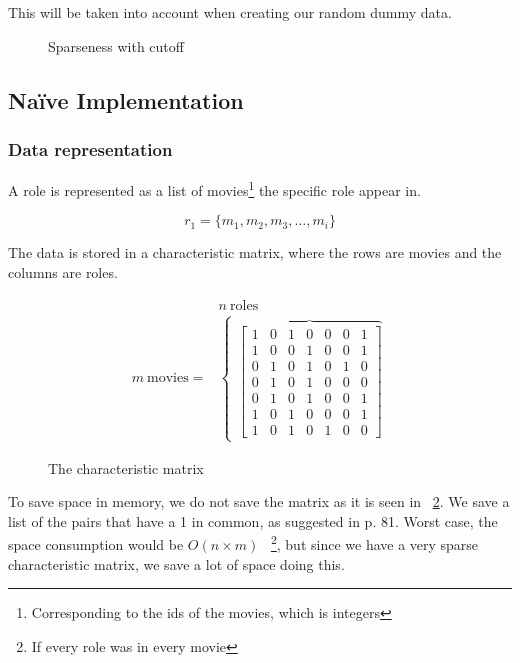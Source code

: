 \documentclass[a4paper,11pt]{article}
\begin{document}
This will be taken into account when creating our random dummy data.

\begin{figure}[!htbp]
    \begin{center}
        
        \caption{Sparseness with cutoff}
        \label{fig:sparsenesscutoff}
    \end{center}
\end{figure}

\subsection{Naïve Implementation}

\subsubsection{Data representation}
A role is represented as a list of movies\footnote{Corresponding to the ids of the movies, which is integers} the specific role appear in.

\begin{equation}
r_1 = \{m_1, m_2, m_3, \ldots , m_i\}
\end{equation}

The data is stored in a characteristic matrix, where the rows are movies and the columns are roles.

\begin{figure}[!htbp]
\begin{eqnarray*}
 & n \ \text{roles} \\
 m \ \text{movies} = & 
\begin{cases}
    \overbrace{
    \begin{bmatrix}
        1 & 0 & 1 & 0 & 0 & 0 & 1\\
        1 & 0 & 0 & 1 & 0 & 0 & 1\\
        0 & 1 & 0 & 1 & 0 & 1 & 0\\
        0 & 1 & 0 & 1 & 0 & 0 & 0\\
        0 & 1 & 0 & 1 & 0 & 0 & 1\\
        1 & 0 & 1 & 0 & 0 & 0 & 1\\
        1 & 0 & 1 & 0 & 1 & 0 & 0
    \end{bmatrix} 
    }
\end{cases}
\end{eqnarray*}
\caption{The characteristic matrix}
\label{fig:char_matrix}
\end{figure}

To save space in memory, we do not save the matrix as it is seen in ~\ref{fig:char_matrix}. We save a list of the pairs that have a 1 in common, as suggested in \cite{book:mmds} p. 81. Worst case, the space consumption would be $O(n \times m)$ \ \footnote{If every role was in every movie}, but since we have a very sparse characteristic matrix, we save a lot of space doing this. \\
\end{document}
